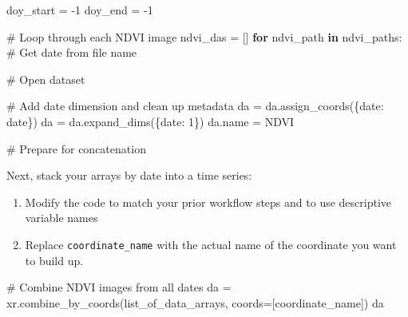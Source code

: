 \documentclass[
  letterpaper,
  DIV=11,
  numbers=noendperiod,
  oneside]{scrreprt}
\newenvironment{Shaded}{\begin{snugshade}}{\end{snugshade}}
\newcommand{\CommentTok}[1]{\textcolor[rgb]{0.37,0.37,0.37}{#1}}
\newcommand{\ControlFlowTok}[1]{\textcolor[rgb]{0.00,0.23,0.31}{\textbf{#1}}}
\newcommand{\DecValTok}[1]{\textcolor[rgb]{0.68,0.00,0.00}{#1}}
\newcommand{\KeywordTok}[1]{\textcolor[rgb]{0.00,0.23,0.31}{\textbf{#1}}}
\newcommand{\NormalTok}[1]{\textcolor[rgb]{0.00,0.23,0.31}{#1}}
\newcommand{\OperatorTok}[1]{\textcolor[rgb]{0.37,0.37,0.37}{#1}}
\newcommand{\StringTok}[1]{\textcolor[rgb]{0.13,0.47,0.30}{#1}}
\providecommand{\tightlist}{%
  \setlength{\itemsep}{0pt}\setlength{\parskip}{0pt}}
\begin{document}
\begin{Shaded}
\begin{Highlighting}[]
\NormalTok{doy\_start }\OperatorTok{=} \OperatorTok{{-}}\DecValTok{1}
\NormalTok{doy\_end }\OperatorTok{=} \OperatorTok{{-}}\DecValTok{1}

\CommentTok{\# Loop through each NDVI image}
\NormalTok{ndvi\_das }\OperatorTok{=}\NormalTok{ []}
\ControlFlowTok{for}\NormalTok{ ndvi\_path }\KeywordTok{in}\NormalTok{ ndvi\_paths:}
    \CommentTok{\# Get date from file name}

    \CommentTok{\# Open dataset}

    \CommentTok{\# Add date dimension and clean up metadata}
\NormalTok{    da }\OperatorTok{=}\NormalTok{ da.assign\_coords(\{}\StringTok{\textquotesingle{}date\textquotesingle{}}\NormalTok{: date\})}
\NormalTok{    da }\OperatorTok{=}\NormalTok{ da.expand\_dims(\{}\StringTok{\textquotesingle{}date\textquotesingle{}}\NormalTok{: }\DecValTok{1}\NormalTok{\})}
\NormalTok{    da.name }\OperatorTok{=} \StringTok{\textquotesingle{}NDVI\textquotesingle{}}

    \CommentTok{\# Prepare for concatenation}
\end{Highlighting}
\end{Shaded}

\begin{tcolorbox}[enhanced jigsaw, colbacktitle=quarto-callout-color!10!white, opacityback=0, bottomtitle=1mm, toptitle=1mm, bottomrule=.15mm, left=2mm, colframe=quarto-callout-color-frame, leftrule=.75mm, opacitybacktitle=0.6, colback=white, rightrule=.15mm, toprule=.15mm, breakable, titlerule=0mm, title=\textcolor{quarto-callout-color}{\faInfo}\hspace{0.5em}{Try It}, coltitle=black, arc=.35mm]

Next, stack your arrays by date into a time series:

\begin{enumerate}
\def\labelenumi{\arabic{enumi}.}
\tightlist
\item
  Modify the code to match your prior workflow steps and to use
  descriptive variable names
\item
  Replace \texttt{coordinate\_name} with the actual name of the
  coordinate you want to build up.
\end{enumerate}

\end{tcolorbox}

\begin{Shaded}
\begin{Highlighting}[]
\CommentTok{\# Combine NDVI images from all dates}
\NormalTok{da }\OperatorTok{=}\NormalTok{ xr.combine\_by\_coords(list\_of\_data\_arrays, coords}\OperatorTok{=}\NormalTok{[}\StringTok{\textquotesingle{}coordinate\_name\textquotesingle{}}\NormalTok{])}
\NormalTok{da}
\end{Highlighting}
\end{Shaded}
\end{document}
